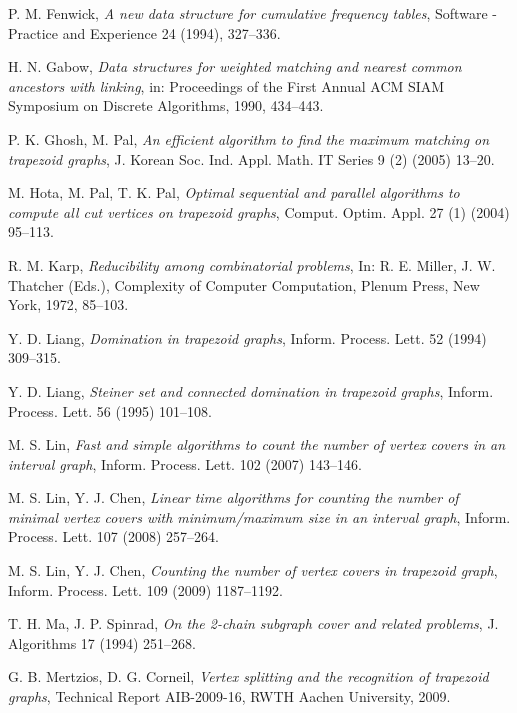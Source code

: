 \documentclass[11pt,letter]{article}
\begin{document}
\begin{thebibliography}{99}
    P. M. Fenwick,
    \emph{A new data structure for cumulative frequency tables},
    Software - Practice and Experience 24 (1994), 327--336.

    H. N. Gabow,
    \emph{Data structures for weighted matching and nearest common ancestors with linking},
    in: Proceedings of the First Annual ACM SIAM Symposium on Discrete Algorithms, 1990, 434--443.

    P. K. Ghosh, M. Pal,
    \emph{An efficient algorithm to find the maximum matching on trapezoid graphs},
    J. Korean Soc. Ind. Appl. Math. IT Series 9 (2) (2005) 13--20.

    M. Hota, M. Pal, T. K. Pal,
    \emph{Optimal sequential and parallel algorithms to compute all cut vertices on trapezoid graphs},
    Comput. Optim. Appl. 27 (1) (2004) 95--113.

    R. M. Karp,
    \emph{Reducibility among combinatorial problems},
    In: R. E. Miller, J. W. Thatcher (Eds.), Complexity of Computer Computation, Plenum Press, New York,
    1972, 85--103.

    Y. D. Liang,
    \emph{Domination in trapezoid graphs},
    Inform. Process. Lett. 52 (1994) 309--315.

    Y. D. Liang,
    \emph{Steiner set and connected domination in trapezoid graphs},
    Inform. Process. Lett. 56 (1995) 101--108.

    M. S. Lin,
    \emph{Fast and simple algorithms to count the number of vertex covers in an interval graph},
    Inform. Process. Lett. 102 (2007) 143--146.

    M. S. Lin, Y. J. Chen,
    \emph{Linear time algorithms for counting the number of minimal vertex covers with minimum/maximum size in an interval graph},
    Inform. Process. Lett. 107 (2008) 257--264.

    M. S. Lin, Y. J. Chen,
    \emph{Counting the number of vertex covers in trapezoid graph},
    Inform. Process. Lett. 109 (2009) 1187--1192.

    T. H. Ma, J. P. Spinrad,
    \emph{On the 2-chain subgraph cover and related problems},
    J. Algorithms 17 (1994) 251--268.

    G. B. Mertzios, D. G. Corneil, \emph{Vertex splitting and the recognition of trapezoid graphs},
    Technical Report AIB-2009-16, RWTH Aachen University, 2009.


\end{thebibliography}
\end{document}
